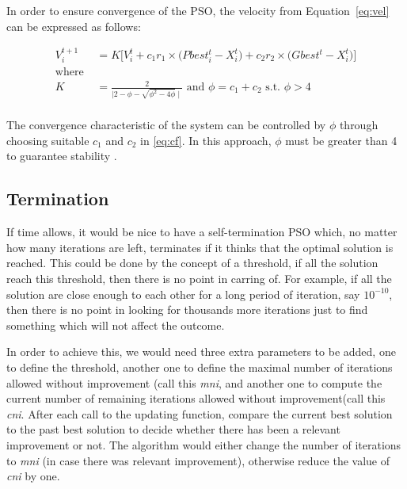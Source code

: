 \documentclass{pdfmx4020}
\begin{document}
    In order to ensure convergence of the PSO, the velocity from Equation~\ref{eq:vel} can be expressed as follows:

    \begin{equation} \label{eq:cf}
      \begin{split}
        V_{i}^{t+1} & = K \Bigg[ V_{i}^{t} + c_1 r_1 \times \Big( Pbest_{i}^{t} - X_{i}^{t} \Big) + c_2 r_2 \times \Big( Gbest^{t} - X_{i}^{t} \Big) \Bigg] \\
        \text{where }\\
        K & = \frac{2}{\mid 2 - \phi - \sqrt{\phi^2 -4\phi} \mid} \text{ and } \phi = c_1 + c_2 \text{ s.t. } \phi > 4  \\
      \end{split}
    \end{equation}

    The convergence characteristic of the system can be controlled by $\phi$ through choosing suitable $c_1$ and $c_2$ in \eqref{eq:cf}. In this approach, $\phi$ must be greater than 4 to guarantee stability \cite{constriction_factor_2}.
    \subsection{Termination} %
    \label{sub:termination}
    If time allows, it would be nice to have a self-termination PSO which, no matter how many iterations are left, terminates if it thinks that the optimal solution is reached. This could be done by the concept of a threshold, if all the solution reach this threshold, then there is no point in carring of. For example, if all the solution are close enough to each other for a long period of iteration, say $10^{-10}$, then there is no point in looking for thousands more iterations just to find something which will not affect the outcome. 

    In order to achieve this, we would need three extra parameters to be added, one to define the threshold, another one to define the maximal number of iterations allowed without improvement (call this \textit{mni}, and another one to compute the current number of remaining iterations allowed without improvement(call this \textit{cni}. After each call to the updating function, compare the current best solution to the past best solution to decide whether there has been a relevant improvement or not. The algorithm would either change the number of iterations to \textit{mni} (in case there was relevant improvement), otherwise reduce the value of \textit{cni} by one. 
\end{document}
